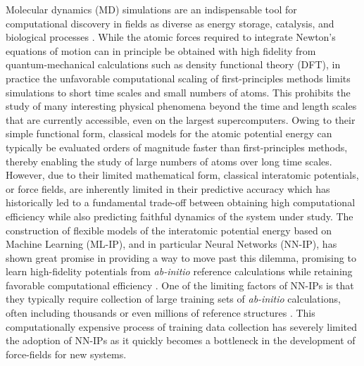 \documentclass[11pt]{article}
\begin{document}
Molecular dynamics (MD) simulations are an indispensable tool for computational discovery in fields as diverse as energy storage, catalysis, and biological processes \cite{richards2016design, boero1998first, lindorff2011fast}. While the atomic forces required to integrate Newton's equations of motion can in principle be obtained with high fidelity from quantum-mechanical calculations such as density functional theory (DFT), in practice the unfavorable computational scaling of first-principles methods limits simulations to short time scales and small numbers of atoms. This prohibits the study of many interesting physical phenomena beyond the time and length scales that are currently accessible, even on the largest supercomputers. Owing to their simple functional form, classical models for the atomic potential energy can typically be evaluated orders of magnitude faster than first-principles methods, thereby enabling the study of large numbers of atoms over long time scales. However, due to their limited mathematical form, classical interatomic potentials, or force fields, are inherently limited in their predictive accuracy which has historically led to a fundamental trade-off between obtaining high computational efficiency while also predicting faithful dynamics of the system under study. The construction of flexible models of the interatomic potential energy based on Machine Learning (ML-IP), and in particular Neural Networks (NN-IP), has shown great promise in providing a way to move past this dilemma, promising to learn high-fidelity potentials from \textit{ab-initio} reference calculations  while retaining favorable computational efficiency \cite{behler2007generalized, gaporiginalpaper, shapeev2016moment, thompson2015spectral, vandermause2020fly, schnet_neurips, physnet_jctc, klicpera2020directional, dcf, gnnff}. One of the limiting factors of NN-IPs is that they typically require collection of large training sets of \textit{ab-initio} calculations, often including thousands or even millions of reference structures \cite{behler2007generalized, artrith2014understanding, schnet_neurips, deepmd, physnet_jctc, smith2017ani}. This computationally expensive process of training data collection has severely limited the adoption of NN-IPs as it quickly becomes a bottleneck in the development of force-fields for new systems. \\
\end{document}
